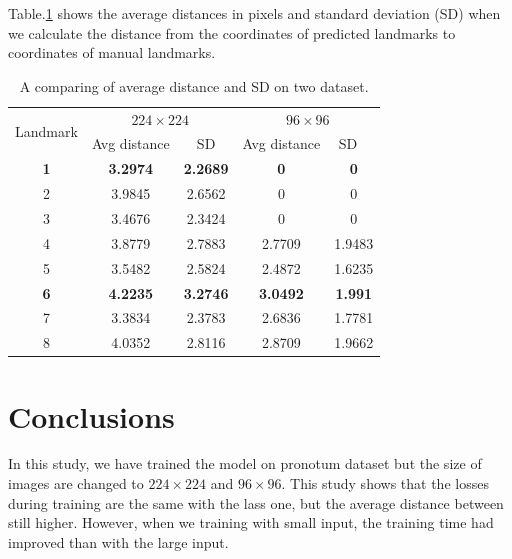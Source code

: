 \documentclass[12pt,a4paper]{article}
\begin{document}
Table.\ref{tab3} shows the average distances in pixels and standard deviation (SD) when we calculate the distance from the coordinates of predicted landmarks to coordinates of manual landmarks.
\begin{table}[htbp]
\centering
\begin{tabular}{ | c | c | c | c | c | }
\hline
	\multicolumn{1}{|c|}{\multirow{2}{*}{Landmark}} & \multicolumn{2}{c|}{$224 \times 224$} &  \multicolumn{2}{c|}{$96 \times 96$}  \\ \cline{2-5}
	 & Avg distance & SD & Avg distance & SD \  \\ \hline
	\textbf{1} & \textbf{3.2974
} & \textbf{2.2689
} & \textbf{0} & \textbf{0} \\ \hline
	2 & 3.9845 & 2.6562 & 0 & 0 \\ \hline
	3 & 3.4676 & 2.3424 & 0 & 0 \\ \hline
	4 & 3.8779 & 2.7883 & 2.7709 & 1.9483 \\ \hline
	5 & 3.5482 & 2.5824 & 2.4872 & 1.6235 \\ \hline
	\textbf{6} & \textbf{4.2235} & \textbf{3.2746} & \textbf{3.0492} & \textbf{1.991} \\ \hline
	7 & 3.3834 & 2.3783 & 2.6836 & 1.7781 \\ \hline
	8 & 4.0352 & 2.8116 & 2.8709 & 1.9662 \\ \hline	
\end{tabular}
\caption{\small{A comparing of average distance and SD on two dataset.}}
\label{tab3}
\end{table}


\section{Conclusions}
In this study, we have trained the model on pronotum dataset but the size of images are changed to $224 \times 224$ and $96 \times 96$. This study shows that the losses during training are the same with the lass one, but the average distance between still higher. However, when we training with small input, the training time had improved than with the large input.


\end{document}
